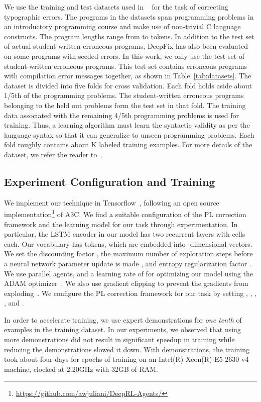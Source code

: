\documentclass{article}
\begin{document}
We use the training and test datasets used in ~\cite{gupta2017deepfix} for the task of correcting typographic errors.
The programs in the datasets span  programming problems in an introductory programming course and make use of non-trivial C language constructs.
The program lengths  range from  to  tokens.
In addition to the test set of actual student-written erroneous programs,
DeepFix has also been evaluated on some programs with seeded errors.
In this work, we only use the test set of student-written erroneous programs.
This test set contains  erroneous programs with
 compilation error messages together, as shown in Table~\ref{tab:datasets}.
The dataset is divided into five folds for cross validation.
Each fold holds aside about 1/5th of the  programming problems.
The student-written erroneous programs belonging to the held out problems
form the test set in that fold.
The training data associated with the remaining 4/5th programming problems is used for training.
Thus, a learning algorithm must learn the syntactic validity as per the language syntax so that it can generalize to unseen programming problems.
Each fold roughly contains about K labeled training examples. 
For more details of the dataset, we refer the reader to~\cite{gupta2017deepfix}.

\subsection{Experiment Configuration and Training}
We implement our technique in Tensorflow~\cite{abadi2016tensorflow}, following an open source implementation\footnote{\small{\url{https://github.com/awjuliani/DeepRL-Agents/}}} of A3C.
We find a suitable configuration of the PL correction framework and the learning model for our task through experimentation.
In particular, the LSTM encoder in our model has two recurrent layers with  cells each. Our vocabulary has  tokens, which are embedded into -dimensional vectors.
We set the discounting factor , the maximum number of exploration steps before a neural network parameter update is made , and entropy regularization factor . 
We use  parallel agents, and a learning rate of  for optimizing our model using the ADAM optimizer~\cite{kingma2015adam}.
We also use gradient clipping to prevent the gradients from exploding~\cite{pascanu2013difficulty}.
We configure the PL correction framework for our task by setting , , , , and .

In order to accelerate training, we use expert demonstrations for \emph{one tenth} of examples in the training dataset.
In our experiments, we observed that using more demonstrations did not result in significant speedup in training while reducing the demonstrations slowed it down.
With demonstrations, the training took about four days for  epochs of training on an Intel(R) Xeon(R) E5-2630 v4 machine, clocked at 2.20GHz with 32GB of RAM.
\end{document}
